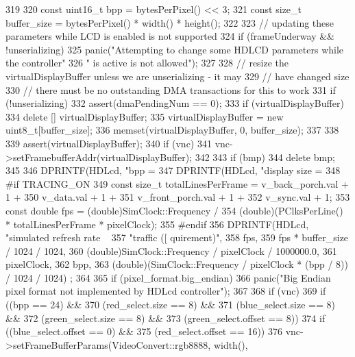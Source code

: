 \begin{DoxyCode}
319 {
320     const uint16_t bpp = bytesPerPixel() << 3;
321     const size_t buffer_size = bytesPerPixel() * width() * height();
322 
323     // updating these parameters while LCD is enabled is not supported
324     if (frameUnderway && !unserializing)
325         panic("Attempting to change some HDLCD parameters while the controller"
326                 " is active is not allowed");
327 
328     // resize the virtualDisplayBuffer unless we are unserializing - it may
329     //   have changed size
330     // there must be no outstanding DMA transactions for this to work
331     if (!unserializing) {
332         assert(dmaPendingNum == 0);
333         if (virtualDisplayBuffer)
334             delete [] virtualDisplayBuffer;
335         virtualDisplayBuffer = new uint8_t[buffer_size];
336         memset(virtualDisplayBuffer, 0, buffer_size);
337     }
338 
339     assert(virtualDisplayBuffer);
340     if (vnc)
341         vnc->setFramebufferAddr(virtualDisplayBuffer);
342 
343     if (bmp)
344         delete bmp;
345 
346     DPRINTF(HDLcd, "bpp = %
347     DPRINTF(HDLcd, "display size = %
348 #if TRACING_ON
349     const size_t totalLinesPerFrame = v_back_porch.val + 1 +
350                                       v_data.val + 1 +
351                                       v_front_porch.val + 1 +
352                                       v_sync.val + 1;
353     const double fps = (double)SimClock::Frequency /
354             (double)(PClksPerLine() * totalLinesPerFrame * pixelClock);
355 #endif
356     DPRINTF(HDLcd, "simulated refresh rate ~ %
357             "traffic ([%
      quirement)\n",
358             fps,
359             fps * buffer_size / 1024 / 1024,
360             (double)SimClock::Frequency / pixelClock / 1000000.0,
361             pixelClock,
362             bpp,
363             (double)(SimClock::Frequency / pixelClock * (bpp / 8)) / 1024 / 1024)
      ;
364 
365     if (pixel_format.big_endian)
366         panic("Big Endian pixel format not implemented by HDLcd controller");
367 
368     if (vnc) {
369         if ((bpp == 24) &&
370                 (red_select.size == 8) &&
371                 (blue_select.size == 8) &&
372                 (green_select.size == 8) &&
373                 (green_select.offset == 8)) {
374             if ((blue_select.offset == 0) &&
375                     (red_select.offset == 16)) {
376                 vnc->setFrameBufferParams(VideoConvert::rgb8888, width(),
}}}}
\end{DoxyCode}
